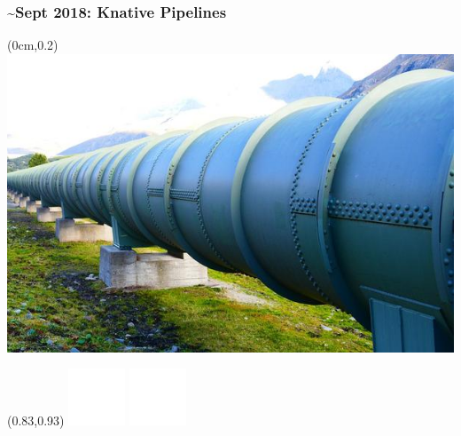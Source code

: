 \documentclass[aspectratio=169,11pt,hyperref={colorlinks=true}]{beamer}
\begin{document}
\begin{lblackrwhiteframe}
\begin{lblackrwhiteframe}
\begin{blackframe}
  \frametitle{\textasciitilde Sept 2018: Knative Pipelines}
  \begin{textblock*}{\paperwidth}(0cm,0.2\paperheight)
    \includegraphics[width=\paperwidth]{img/pipeline_cc0.jpg}
  \end{textblock*}
  \begin{textblock*}{0.2\paperwidth}(0.83\paperwidth,0.93\paperheight)
    \includegraphics[width=0.03\paperwidth]{img/cc.png}
    \includegraphics[width=0.03\paperwidth]{img/zero.png}
  \end{textblock*}
\end{blackframe}


\end{lblackrwhiteframe}
\end{lblackrwhiteframe}
\end{document}
